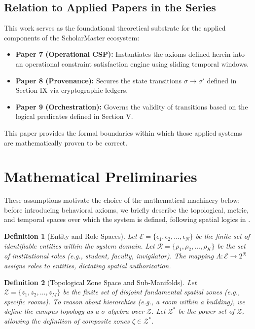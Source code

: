 \documentclass[conference]{IEEEtran}
\newtheorem{definition}{Definition}
\newcommand{\E}{\mathcal{E}} %
\newcommand{\Z}{\mathcal{Z}} %
\newcommand{\Roles}{\mathcal{R}} %
\begin{document}
\subsection{Relation to Applied Papers in the Series}
This work serves as the foundational theoretical substrate for the applied components of the ScholarMaster ecosystem:
\begin{itemize}
    \item \textbf{Paper 7 (Operational CSP):} Instantiates the axioms defined herein into an operational constraint satisfaction engine using sliding temporal windows.
    \item \textbf{Paper 8 (Provenance):} Secures the state transitions $\sigma \to \sigma'$ defined in Section IX via cryptographic ledgers.
    \item \textbf{Paper 9 (Orchestration):} Governs the validity of transitions based on the logical predicates defined in Section V.
\end{itemize}
This paper provides the formal boundaries within which those applied systems are mathematically proven to be correct.

\section{Mathematical Preliminaries}

These assumptions motivate the choice of the mathematical machinery below; before introducing behavioral axioms, we briefly describe the topological, metric, and temporal spaces over which the system is defined, following spatial logics in \cite{b16}.

\begin{definition}[Entity and Role Spaces]
Let $\E = \{ \epsilon_1, \epsilon_2, \dots, \epsilon_N \}$ be the finite set of identifiable entities within the system domain. Let $\Roles = \{ \rho_1, \rho_2, \dots, \rho_K \}$ be the set of institutional roles (e.g., student, faculty, invigilator). The mapping $\Lambda: \E \to 2^\Roles$ assigns roles to entities, dictating spatial authorization.
\end{definition}

\begin{definition}[Topological Zone Space and Sub-Manifolds]
Let $\Z = \{ z_1, z_2, \dots, z_M \}$ be the finite set of disjoint fundamental spatial zones (e.g., specific rooms). To reason about hierarchies (e.g., a room within a building), we define the campus topology as a $\sigma$-algebra over $\Z$. Let $\Z^*$ be the power set of $\Z$, allowing the definition of composite zones $\zeta \in \Z^*$. 
\end{definition}
\end{document}
